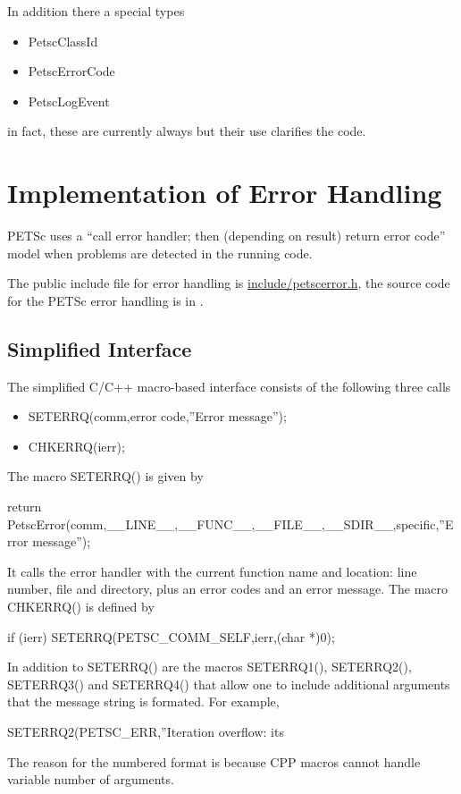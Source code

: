 \documentclass[twoside,12pt]{../sty/report_petsc}
\begin{document}
In addition there a special types
\begin{itemize}
  \item PetscClassId
  \item PetscErrorCode
  \item PetscLogEvent
\end{itemize}
in fact, these are currently always  but their use clarifies the code.

\section{Implementation of Error Handling}

PETSc  uses a ``call error handler; then (depending on result) return
error code'' model when problems are detected in the running code. 

The public include file for error handling is
 \href{http://www.mcs.anl.gov/petsc/petsc-dev/include/petscerror.h.html}{include/petscerror.h}, the 
source code for the PETSc error handling is in  
.

\subsection{Simplified Interface}

The simplified C/C++ macro-based interface consists of the following three calls
\begin{itemize}
\item SETERRQ(comm,error code,''Error message'');
\item CHKERRQ(ierr);
\end{itemize}

The macro SETERRQ() is given by 
\begin{tabbing}
return PetscError(comm,\_\_LINE\_\_,\_\_FUNC\_\_,\_\_FILE\_\_,\_\_SDIR\_\_,specific,''Error message'');
\end{tabbing}
It calls the error handler with the current function name and location: line number,
file and directory, plus an error codes and an error message.
The macro CHKERRQ() is defined by
\begin{tabbing}
  if (ierr) SETERRQ(PETSC\_COMM\_SELF,ierr,(char *)0);
\end{tabbing}

In addition to SETERRQ() are the macros SETERRQ1(), SETERRQ2(), SETERRQ3()
and SETERRQ4() that allow one to include additional arguments that the message
string is formated. For example,
\begin{tabbing}
  SETERRQ2(PETSC\_ERR,''Iteration overflow: its %
\end{tabbing}
The reason for the numbered format is because CPP macros cannot handle variable number
of arguments.
 
\end{document}
